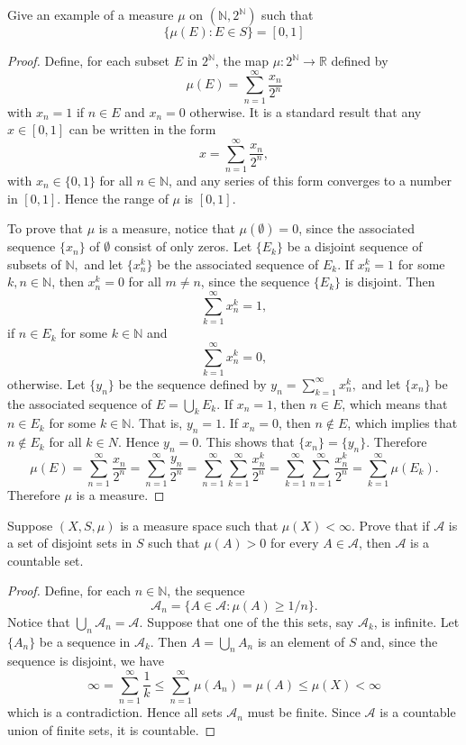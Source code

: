 \documentclass[14.5pt]{article}
\newcommand{\N}{\mathbb{N}}
\newcommand{\R}{\mathbb{R}}
\newenvironment{problem}[2][Problem]{\begin{mdframed}[backgroundcolor=gray!10, leftline = false, rightline=false, linewidth=0.25pt]  \begin{trivlist}
\item[\hskip \labelsep {\bfseries #1}\hskip \labelsep {\bfseries #2.}]}{\end{trivlist} \end{mdframed}  }
\begin{document}
\begin{problem}{2C.3} Give an example of a measure $\mu$ on $(\N, 2^\N)$ such that 
$$\{\mu(E) : E \in S\} = [0,1]$$
\end{problem}
\begin{proof}
    Define, for each subset $E$ in $2^\N$, the map $\mu: 2^\N \rightarrow \R$ defined by
    $$\mu(E) = \sum_{n=1}^\infty \frac{x_n}{2^n}$$
    with $x_n = 1$ if $n \in E$ and $x_n = 0$ otherwise. It is a standard result that any $x \in [0,1]$ can be written in the form
    $$x =  \sum_{n=1}^\infty \frac{x_n}{2^n},$$
    with $x_n \in \{0,1\}$ for all $n\in \N$, and any series of this form converges to a number in $[0,1].$ Hence the range of $\mu$ is $[0,1].$
    
    To prove that $\mu$ is a measure, notice that $\mu(\emptyset) = 0$, since the associated sequence $\{x_n\}$ of $\emptyset$ consist of only zeros. Let $\{E_k\}$ be a disjoint sequence of subsets of $\N,$ and let $\{x_n^k\}$ be the associated sequence of $E_k$. 
    If $x_n^k = 1$ for some $k,n \in \N$, then $x_n^k = 0$ for all $m \neq n$, since the sequence $\{E_k\}$ is disjoint. Then
    $$\sum_{k=1}^\infty x_n^k = 1,$$
    if $n \in E_k$ for some $k\in \N$ and
    $$\sum_{k=1}^\infty x_n^k = 0,$$
    otherwise. Let $\{y_n\}$ be the sequence defined by $y_n = \sum_{k=1}^\infty x_n^k,$ and let $\{x_n\}$ be the associated sequence of $E = \bigcup_k E_k$. If $x_n = 1$, then $n \in E$, which means that $n \in E_k$ for some $k\in \N.$ That is, $y_n = 1.$ If $x_n = 0$, then $n \notin E$, which implies that $n \notin E_k$ for all $k\in N$. Hence $y_n = 0.$ This shows that $\{x_n\} = \{y_n\}$. Therefore
    $$\mu(E) = \sum_{n=1}^\infty \frac{x_n}{2^n} = \sum_{n=1}^\infty \frac{y_n}{2^n} = \sum_{n=1}^\infty \sum_{k=1}^\infty  \frac{x_n^k}{2^n} = \sum_{k=1}^\infty \sum_{n=1}^\infty \frac{x_n^k}{2^n} = \sum_{k=1}^\infty \mu(E_k).$$
    Therefore $\mu$ is a measure.
\end{proof}


\begin{problem}{2C.5} Suppose $(X, S, \mu)$ is a measure space such that $\mu(X) < \infty$. Prove that if $\mathcal A$ is a set of disjoint sets in $S$ such that $\mu(A) > 0$ for every $A \in \mathcal A$, then $\mathcal A$ is a countable set.
\end{problem}
\begin{proof}
    Define, for each $n\in \N$, the sequence 
    $$\mathcal{A}_n = \{A \in \mathcal{A}: \mu(A) \geq 1 / n\}.$$
Notice that $\bigcup_{n} \mathcal A_n = \mathcal{A}$. Suppose that one of the this sets, say $\mathcal{A}_k$, is infinite. Let  $\{A_n\}$ be a sequence in $\mathcal A_k$. Then $A = \bigcup_n A_n$ is an element of $S$ and, since the sequence is disjoint, we have
$$ \infty = \sum_{n=1}^\infty \frac{1}{k} \leq \sum_{n=1}^\infty \mu(A_n) = \mu(A) \leq \mu(X) < \infty$$
which is a contradiction. Hence all sets $\mathcal A_n$ must be finite. Since $\mathcal A $ is a countable union of finite sets, it is countable.
\end{proof}
\end{document}
